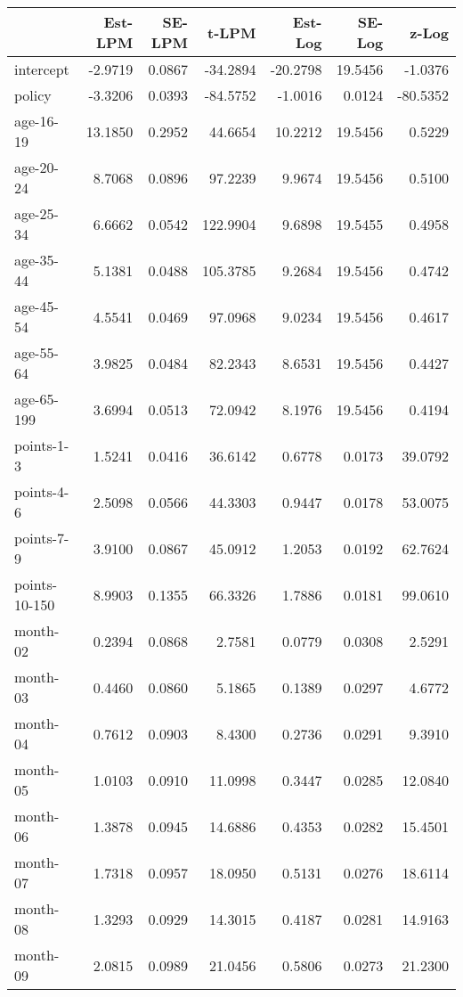 \documentclass[10pt]{article}
\begin{document}
\begin{table}[ht]
\centering
\begin{tabular}{lrrrrrr}
  \hline
 & Est-LPM & SE-LPM & t-LPM & Est-Log & SE-Log & z-Log \\ 
  \hline
intercept & -2.9719 & 0.0867 & -34.2894 & -20.2798 & 19.5456 & -1.0376 \\ 
  policy & -3.3206 & 0.0393 & -84.5752 & -1.0016 & 0.0124 & -80.5352 \\ 
  age-16-19 & 13.1850 & 0.2952 & 44.6654 & 10.2212 & 19.5456 & 0.5229 \\ 
  age-20-24 & 8.7068 & 0.0896 & 97.2239 & 9.9674 & 19.5456 & 0.5100 \\ 
  age-25-34 & 6.6662 & 0.0542 & 122.9904 & 9.6898 & 19.5455 & 0.4958 \\ 
  age-35-44 & 5.1381 & 0.0488 & 105.3785 & 9.2684 & 19.5456 & 0.4742 \\ 
  age-45-54 & 4.5541 & 0.0469 & 97.0968 & 9.0234 & 19.5456 & 0.4617 \\ 
  age-55-64 & 3.9825 & 0.0484 & 82.2343 & 8.6531 & 19.5456 & 0.4427 \\ 
  age-65-199 & 3.6994 & 0.0513 & 72.0942 & 8.1976 & 19.5456 & 0.4194 \\ 
  points-1-3 & 1.5241 & 0.0416 & 36.6142 & 0.6778 & 0.0173 & 39.0792 \\ 
  points-4-6 & 2.5098 & 0.0566 & 44.3303 & 0.9447 & 0.0178 & 53.0075 \\ 
  points-7-9 & 3.9100 & 0.0867 & 45.0912 & 1.2053 & 0.0192 & 62.7624 \\ 
  points-10-150 & 8.9903 & 0.1355 & 66.3326 & 1.7886 & 0.0181 & 99.0610 \\ 
  month-02 & 0.2394 & 0.0868 & 2.7581 & 0.0779 & 0.0308 & 2.5291 \\ 
  month-03 & 0.4460 & 0.0860 & 5.1865 & 0.1389 & 0.0297 & 4.6772 \\ 
  month-04 & 0.7612 & 0.0903 & 8.4300 & 0.2736 & 0.0291 & 9.3910 \\ 
  month-05 & 1.0103 & 0.0910 & 11.0998 & 0.3447 & 0.0285 & 12.0840 \\ 
  month-06 & 1.3878 & 0.0945 & 14.6886 & 0.4353 & 0.0282 & 15.4501 \\ 
  month-07 & 1.7318 & 0.0957 & 18.0950 & 0.5131 & 0.0276 & 18.6114 \\ 
  month-08 & 1.3293 & 0.0929 & 14.3015 & 0.4187 & 0.0281 & 14.9163 \\ 
  month-09 & 2.0815 & 0.0989 & 21.0456 & 0.5806 & 0.0273 & 21.2300 \\ 

\end{tabular}
\end{table}
\end{document}
